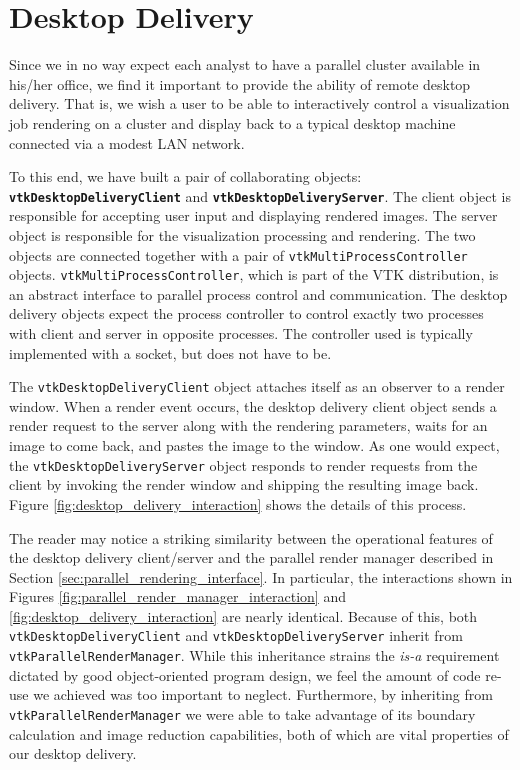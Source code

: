 \documentclass{acmsiggraph}
\newcommand{\cidentifier}[1]{\texttt{#1}}
\newcommand{\keyterm}[1]{\textbf{#1}}
\begin{document}
  \section{Desktop Delivery}
  \label{sec:desktop_delivery}

  Since we in no way expect each analyst to have a parallel cluster
  available in his/her office, we find it important to provide the ability
  of remote desktop delivery.  That is, we wish a user to be able to
  interactively control a visualization job rendering on a cluster and
  display back to a typical desktop machine connected via a modest LAN
  network.

  To this end, we have built a pair of collaborating objects:
  \keyterm{\cidentifier{vtk\-Desktop\-Delivery\-Client}} and
  \keyterm{\cidentifier{vtk\-Desktop\-Delivery\-Server}}.  The client
  object is responsible for accepting user input and displaying rendered
  images.  The server object is responsible for the visualization
  processing and rendering.  The two objects are connected together with a
  pair of \cidentifier{vtk\-Multi\-Process\-Controller} objects.
  \cidentifier{vtk\-Multi\-Process\-Controller}, which is part of the VTK
  distribution, is an abstract interface to parallel process control and
  communication.  The desktop delivery objects expect the process
  controller to control exactly two processes with client and server in
  opposite processes.  The controller used is typically implemented with a
  socket, but does not have to be.

  The \cidentifier{vtk\-Desktop\-Delivery\-Client} object attaches itself
  as an observer to a render window.  When a render event occurs, the
  desktop delivery client object sends a render request to the server along
  with the rendering parameters, waits for an image to come back, and
  pastes the image to the window.  As one would expect, the
  \cidentifier{vtk\-Desktop\-Delivery\-Server} object responds to render
  requests from the client by invoking the render window and shipping the
  resulting image back.  Figure \ref{fig:desktop_delivery_interaction}
  shows the details of this process.

  The reader may notice a striking similarity between the operational
  features of the desktop delivery client/server and the parallel render
  manager described in Section \ref{sec:parallel_rendering_interface}.  In
  particular, the interactions shown in Figures
  \ref{fig:parallel_render_manager_interaction} and
  \ref{fig:desktop_delivery_interaction} are nearly identical.  Because of
  this, both \cidentifier{vtk\-Desktop\-Delivery\-Client} and
  \cidentifier{vtk\-Desktop\-Delivery\-Server} inherit from
  \cidentifier{vtk\-Parallel\-Render\-Manager}.  While this inheritance
  strains the \emph{is-a} requirement dictated by good object-oriented program
  design, we feel the amount of code re-use we achieved was too important
  to neglect.  Furthermore, by inheriting from
  \cidentifier{vtk\-Parallel\-Render\-Manager} we were able to take
  advantage of its boundary calculation and image reduction capabilities,
  both of which are vital properties of our desktop delivery.
\end{document}
